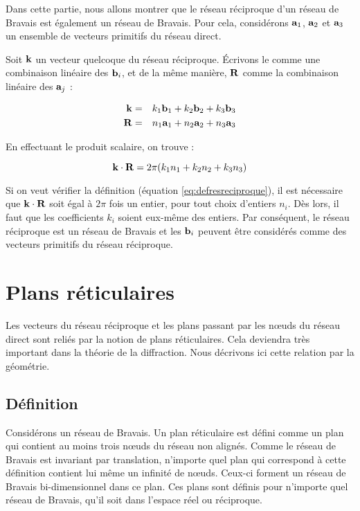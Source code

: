 Dans cette partie, nous allons montrer que le réseau réciproque d'un réseau de Bravais est également un réseau de Bravais. Pour cela, considérons $\mathbf{a}_1$, $\mathbf{a}_2$ et $\mathbf{a}_3$ un ensemble de vecteurs primitifs du réseau direct.

Soit $\mathbf{k}$ un vecteur quelcoque du réseau réciproque. Écrivons le comme une combinaison linéaire des $\mathbf{b}_i$, et de la même manière, $\mathbf{R}$ comme la combinaison linéaire des $\mathbf{a}_j$ :

\begin{eqnarray}
    \mathbf{k} & = & k_1 \mathbf{b}_1 + k_2 \mathbf{b}_2 + k_3 \mathbf{b}_3\\
    \mathbf{R} & = & n_1 \mathbf{a}_1 + n_2 \mathbf{a}_2 + n_3 \mathbf{a}_3
\end{eqnarray}

En effectuant le produit scalaire, on trouve :

\begin{equation}
    \mathbf{k}\cdot\mathbf{R} = 2\pi (k_1 n_1 + k_2n_2 + k_3n_3)
\end{equation}

Si on veut vérifier la définition (équation \ref{eq:defresreciproque}), il est nécessaire que $\mathbf{k}\cdot\mathbf{R}$ soit égal à $2\pi$ fois un entier, pour tout choix d'entiers $n_i$. Dès lors, il faut que les coefficients $k_i$ soient eux-même des entiers. Par conséquent, le réseau réciproque est un réseau de Bravais et les $\mathbf{b}_i$ peuvent être considérés comme des vecteurs
primitifs du réseau réciproque.

\section{Plans réticulaires}

Les vecteurs du réseau réciproque et les plans passant par les nœuds du réseau direct sont reliés par la notion de plans réticulaires. Cela deviendra très important dans la théorie de la diffraction. Nous décrivons ici cette relation par la géométrie.

\subsection{Définition}

Considérons un réseau de Bravais. Un plan réticulaire est défini comme un plan qui contient au moins trois nœuds du réseau non alignés. Comme le réseau de Bravais est invariant par translation, n'importe quel plan qui correspond à cette définition contient lui même un infinité de nœuds. Ceux-ci forment un réseau de Bravais bi-dimensionnel dans ce plan. Ces plans sont définis pour n'importe quel réseau de Bravais, qu'il soit dans l'espace réel ou réciproque.

